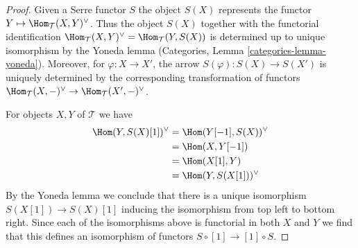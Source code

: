 \begin{proof}
Given a Serre functor $S$ the object $S(X)$ represents
the functor $Y \mapsto \Hom_\mathcal{T}(X, Y)^\vee$.
Thus the object $S(X)$ together with the functorial identification
$\Hom_\mathcal{T}(X, Y)^\vee = \Hom_\mathcal{T}(Y, S(X))$
is determined up to unique isomorphism by the Yoneda lemma
(Categories, Lemma \ref{categories-lemma-yoneda}).
Moreover, for $\varphi : X \to X'$, the arrow $S(\varphi) : S(X) \to S(X')$
is uniquely determined by the corresponding transformation of functors
$\Hom_\mathcal{T}(X, -)^\vee \to \Hom_\mathcal{T}(X', -)^\vee$.

\medskip\noindent
For objects $X, Y$ of $\mathcal{T}$ we have
\begin{align*}
\Hom(Y, S(X)[1])^\vee
& =
\Hom(Y[-1], S(X))^\vee \\
& =
\Hom(X, Y[-1]) \\
& =
\Hom(X[1], Y) \\
& =
\Hom(Y, S(X[1]))^\vee
\end{align*}
By the Yoneda lemma we conclude that there is a unique isomorphism
$S(X[1]) \to S(X)[1]$ inducing the isomorphism from top left to bottom right.
Since each of the isomorphisms above is functorial in both $X$ and $Y$
we find that this defines an isomorphism of functors
$S \circ [1] \to [1] \circ S$.


\end{proof}

